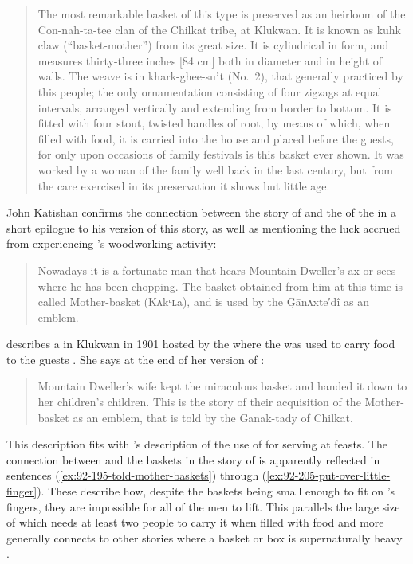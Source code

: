 \begin{quote}\small
The most remarkable basket of this type is preserved as an heirloom of the Con-nah-ta-tee clan of the Chilkat tribe, at Klukwan.
It is known as kuhk claw (“basket-mother”) from its great size.
It is cylindrical in form, and measures thirty-three inches [84 cm] both in diameter and in height of walls.
The weave is in khark-ghee-suʼt (No.\ 2), that generally practiced by this people; the only ornamentation consisting of four zigzags at equal intervals, arranged vertically and extending from border to bottom.
It is fitted with four stout, twisted handles of root, by means of which, when filled with food, it is carried into the house and placed before the guests, for only upon occasions of family festivals is this basket ever shown.
It was worked by a woman of the family well back in the last century, but from the care exercised in its preservation it shows but little age.
\end{quote}

 John Katishan confirms the connection between the story of  and the  of the  in a short epilogue to his version of this story, as well as mentioning the luck accrued from experiencing ’s woodworking activity:

\begin{quote}\small
Nowadays it is a fortunate man that hears Mountain Dweller’s ax or sees where he has been chopping. The basket obtained from him at this time is called Mother-basket (Kᴀkᵘʟa), and is used by the G̣ānᴀxte′dî as an emblem.
\end{quote}

\citeauthor{paul:1944} describes a  in Klukwan in 1901 hosted by the  where the  was used to carry food to the  guests \parencite[69]{paul:1944}.
She says at the end of her version of :

\begin{quote}\small
Mountain Dweller’s wife kept the miraculous basket and handed it down to her children’s children.
This is the story of their acquisition of the Mother-basket as an emblem, that is told by the Ganak-tady of Chilkat.
\end{quote}

This description fits with \citeauthor{emmons:1903}’s description of the use of  for serving at feasts.
The connection between  and the baskets in the story of  is apparently reflected in sentences (\ref{ex:92-195-told-mother-baskets}) through (\ref{ex:92-205-put-over-little-finger}).
These describe how, despite the baskets being small enough to fit on ’s fingers, they are impossible for all of the men to lift.
This parallels the large size of  which needs at least two people to carry it when filled with food and more generally connects to other stories where a basket or box is supernaturally heavy \parencites[236]{swanton:1905}[403–404]{swanton:1908}[466, 888]{boas:1916}[465, 514]{boas:2002}.

